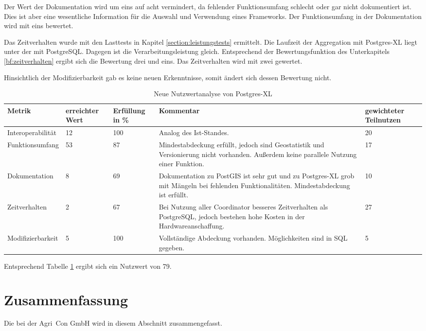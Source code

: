 Der Wert der Dokumentation wird um eins auf acht vermindert, da fehlender Funktionsumfang schlecht oder gar nicht dokumentiert ist.
Dies ist aber eine wesentliche Information für die Auswahl und Verwendung eines Frameworks.
Der Funktionsumfang in der Dokumentation wird mit eins bewertet.

Das Zeitverhalten wurde mit den Lasttests in Kapitel \ref{section:leistungstests} ermittelt.
Die Laufzeit der Aggregation mit Postgres-XL liegt unter der mit PostgreSQL.
Dagegen ist die Verarbeitungsleistung gleich.
Entsprechend der Bewertungsfunktion des Unterkapitels \ref{bf:zeitverhalten} ergibt sich die Bewertung drei und eins.
Das Zeitverhalten wird mit zwei gewertet.

Hinsichtlich der Modifizierbarkeit gab es keine neuen Erkenntnisse, somit ändert sich dessen Bewertung nicht.

\begin{table}[h!]
\centering
\small
\begin{tabular}{|l|p{1.8cm}|l|p{3.1cm}|p{1.8cm}|}
\hline
\textbf{Metrik} & \textbf{erreichter Wert} & \textbf{Erfüllung in \%} & \textbf{Kommentar} & \textbf{gewichteter Teilnutzen} \\ \hline
Interoperabilität & 12 & 100 & Analog des Ist-Standes. & 20 \\ \hline
Funktionsumfang & 53 & 87 & Mindestabdeckung erfüllt, jedoch sind Geostatistik und Versionierung nicht vorhanden. Außerdem keine parallele Nutzung einer Funktion. & 17 \\ \hline
Dokumentation & 8 & 69 & Dokumentation zu PostGIS ist sehr gut und zu Postgres-XL grob mit Mängeln bei fehlenden Funktionalitäten. Mindestabdeckung ist erfüllt. & 10 \\ \hline
Zeitverhalten & 2 & 67 & Bei Nutzung aller Coordinator besseres Zeitverhalten als PostgreSQL, jedoch bestehen hohe Kosten in der Hardwareanschaffung. & 27 \\ \hline
Modifizierbarkeit & 5 & 100 & Vollständige Abdeckung vorhanden. Möglichkeiten sind in SQL gegeben. & 5 \\ \hline
\end{tabular}
\caption{Neue Nutzwertanalyse von Postgres-XL}
\label{table:nutzwertanalyse2-postgresxl}
\end{table}
Entsprechend Tabelle \ref{table:nutzwertanalyse2-postgresxl} ergibt sich ein Nutzwert von 79.

\section{Zusammenfassung}
Die \titel{} bei der Agri~Con GmbH wird in diesem Abschnitt zusammengefasst.

